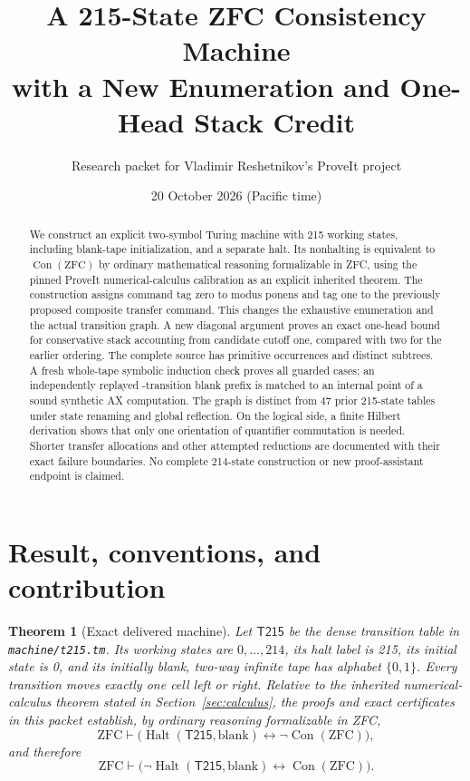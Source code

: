 \documentclass[11pt]{article}
\title{A 215-State ZFC Consistency Machine\\with a New Enumeration and One-Head Stack Credit}
\author{Research packet for Vladimir Reshetnikov's ProveIt project}
\date{20 October 2026 (Pacific time)}
\newtheorem{theorem}{Theorem}[section]
\newcommand{\ZFC}{\mathrm{ZFC}}
\newcommand{\Con}{\operatorname{Con}}
\newcommand{\Halt}{\operatorname{Halt}}
\newcommand{\TT}{\mathsf{T215}}
\begin{document}
\maketitle
\begin{abstract}
We construct an explicit two-symbol Turing machine with 215 working states, including blank-tape initialization, and a separate halt. Its nonhalting is equivalent to $\Con(\ZFC)$ by ordinary mathematical reasoning formalizable in ZFC, using the pinned ProveIt numerical-calculus calibration as an explicit inherited theorem. The construction assigns command tag zero to modus ponens and tag one to the previously proposed composite transfer command. This changes the exhaustive enumeration and the actual transition graph. A new diagonal argument proves an exact one-head bound for conservative stack accounting from candidate cutoff one, compared with two for the earlier ordering. The complete source has \SourceLeaves{} primitive occurrences and \SourceNodes{} distinct subtrees. A fresh whole-tape symbolic induction check proves all \CaseCount{} guarded cases; an independently replayed \BootSteps{}-transition blank prefix is matched to an internal point of a sound synthetic AX computation. The graph is distinct from 47 prior 215-state tables under state renaming and global reflection. On the logical side, a finite Hilbert derivation shows that only one orientation of quantifier commutation is needed. Shorter transfer allocations and other attempted reductions are documented with their exact failure boundaries. No complete 214-state construction or new proof-assistant endpoint is claimed.
\end{abstract}
\newpage
\tableofcontents
\newpage

\section{Result, conventions, and contribution}

\begin{theorem}[Exact delivered machine]
Let $\TT$ be the dense transition table in \texttt{machine/t215.tm}. Its working states are $0,\ldots,214$, its halt label is 215, its initial state is 0, and its initially blank, two-way infinite tape has alphabet $\{0,1\}$. Every transition moves exactly one cell left or right. Relative to the inherited numerical-calculus theorem stated in Section~\ref{sec:calculus}, the proofs and exact certificates in this packet establish, by ordinary reasoning formalizable in ZFC,
\[
 \ZFC\vdash
 \bigl(\Halt(\TT,\mathrm{blank})\leftrightarrow\neg\Con(\ZFC)\bigr),
\]
and therefore
\[
 \ZFC\vdash
 \bigl(\neg\Halt(\TT,\mathrm{blank})\leftrightarrow\Con(\ZFC)\bigr).
\]
\end{theorem}
\end{document}
